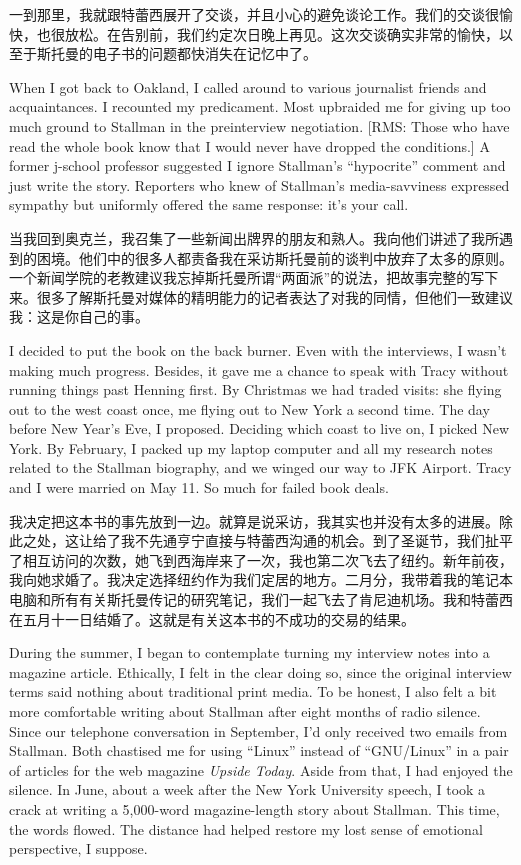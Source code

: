 \ifdefined\chs
一到那里，我就跟特蕾西展开了交谈，并且小心的避免谈论工作。我们的交谈很愉快，也很放松。在告别前，我们约定次日晚上再见。这次交谈确实非常的愉快，以至于斯托曼的电子书的问题都快消失在记忆中了。
\fi

\ifdefined\eng
When I got back to Oakland, I called around to various journalist friends and acquaintances. I recounted my predicament. Most upbraided me for giving up too much ground to Stallman in the preinterview negotiation. [RMS: Those who have read the whole book know that I would never have dropped the conditions.] A former j-school professor suggested I ignore Stallman's ``hypocrite'' comment and just write the story. Reporters who knew of Stallman's media-savviness expressed sympathy but uniformly offered the same response: it's your call.
\fi

\ifdefined\chs
当我回到奥克兰，我召集了一些新闻出牌界的朋友和熟人。我向他们讲述了我所遇到的困境。他们中的很多人都责备我在采访斯托曼前的谈判中放弃了太多的原则。一个新闻学院的老教建议我忘掉斯托曼所谓“两面派”的说法，把故事完整的写下来。很多了解斯托曼对媒体的精明能力的记者表达了对我的同情，但他们一致建议我：这是你自己的事。
\fi

\ifdefined\eng
I decided to put the book on the back burner. Even with the interviews, I wasn't making much progress. Besides, it gave me a chance to speak with Tracy without running things past Henning first. By Christmas we had traded visits: she flying out to the west coast once, me flying out to New York a second time. The day before New Year's Eve, I proposed. Deciding which coast to live on, I picked New York. By February, I packed up my laptop computer and all my research notes related to the Stallman biography, and we winged our way to JFK Airport. Tracy and I were married on May 11. So much for failed book deals.
\fi

\ifdefined\chs
我决定把这本书的事先放到一边。就算是说采访，我其实也并没有太多的进展。除此之处，这让给了我不先通亨宁直接与特蕾西沟通的机会。到了圣诞节，我们扯平了相互访问的次数，她飞到西海岸来了一次，我也第二次飞去了纽约。新年前夜，我向她求婚了。我决定选择纽约作为我们定居的地方。二月分，我带着我的笔记本电脑和所有有关斯托曼传记的研究笔记，我们一起飞去了肯尼迪机场。我和特蕾西在五月十一日结婚了。这就是有关这本书的不成功的交易的结果。
\fi

\ifdefined\eng
During the summer, I began to contemplate turning my interview notes into a magazine article. Ethically, I felt in the clear doing so, since the original interview terms said nothing about traditional print media. To be honest, I also felt a bit more comfortable writing about Stallman after eight months of radio silence. Since our telephone conversation in September, I'd only received two emails from Stallman. Both chastised me for using ``Linux'' instead of ``GNU/Linux'' in a pair of articles for the web magazine \textit{Upside Today}. Aside from that, I had enjoyed the silence. In June, about a week after the New York University speech, I took a crack at writing a 5,000-word magazine-length story about Stallman. This time, the words flowed. The distance had helped restore my lost sense of emotional perspective, I suppose.
\fi

